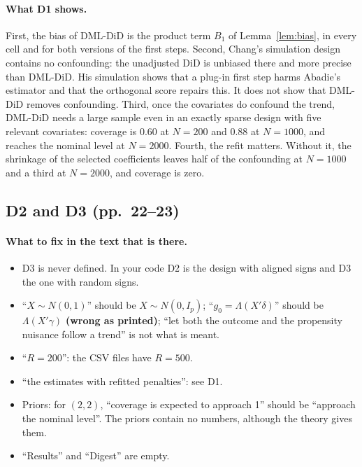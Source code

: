 \documentclass[11pt]{article}
\newcommand{\where}[1]{\par\medskip\noindent{\small\textcolor{black!60}{\textsf{\textbf{Where:} #1}}}\par\nopagebreak\smallskip}
\newenvironment{ins}{\begin{leftbar}}{\end{leftbar}}
\theoremstyle{plain}
\theoremstyle{remark}
\begin{document}
\where{Replace ``Digest'' (p.~22).}
\begin{ins}
\paragraph{What D1 shows.} First, the bias of DML-DiD is the product term $B_1$
of Lemma~\ref{lem:bias}, in every cell and for both versions of the first steps.
Second, Chang's simulation design contains no confounding: the unadjusted DiD is
unbiased there and more precise than DML-DiD. His simulation shows that a
plug-in first step harms Abadie's estimator and that the orthogonal score
repairs this. It does not show that DML-DiD removes confounding. Third, once the
covariates do confound the trend, DML-DiD needs a large sample even in an
exactly sparse design with five relevant covariates: coverage is 0.60 at
$N=200$ and 0.88 at $N=1000$, and reaches the nominal level at $N=2000$. Fourth,
the refit matters. Without it, the shrinkage of the selected coefficients leaves
half of the confounding at $N=1000$ and a third at $N=2000$, and coverage is
zero.
\end{ins}

\subsection{D2 and D3 (pp.~22--23)}

\paragraph{What to fix in the text that is there.}
\begin{itemize}
\item D3 is never defined. In your code D2 is the design with aligned signs and
  D3 the one with random signs.
\item ``$X\sim N(0,1)$'' should be $X\sim N(0,I_p)$; ``$g_0=\Lambda(X'\delta)$''
  should be $\Lambda(X'\gamma)$ \textbf{(wrong as printed)}; ``let both the outcome
  and the propensity nuisance follow a trend'' is not what is meant.
\item ``$R=200$'': the CSV files have $R=500$.
\item ``the estimates with refitted penalties'': see D1.
\item Priors: for $(2,2)$, ``coverage is expected to approach 1'' should be
  ``approach the nominal level''. The priors contain no numbers, although the
  theory gives them.
\item ``Results'' and ``Digest'' are empty.
\end{itemize}
\end{document}
